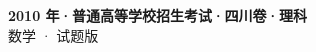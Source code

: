 \documentclass[zihao=-4, a4paper]{ctexart}
\begin{document}
\begin{center}
  {\Large\bfseries 2010 年·普通高等学校招生考试·四川卷·理科}\\[4pt]
  {\large 数学 · 试题版}
\end{center}
\medskip
{}

\end{document}
